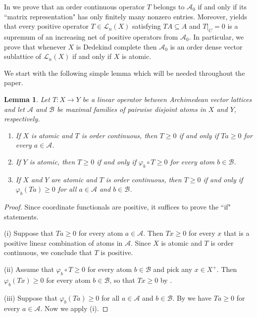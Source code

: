 \documentclass[12pt,reqno]{amsart}
\theoremstyle{plain}
\newtheorem{lemma}[theorem]{Lemma}
\theoremstyle{definition}
\begin{document}
In  we prove that an order continuous operator $T$ belongs to $\mathscr A_0$ if and only if its ``matrix representation" has only finitely many nonzero entries. Moreover,  yields that every positive operator $T\in \mathscr L_n(X)$ satisfying $TA\subseteq A$ and $T|_C=0$ is a supremum of an increasing net of positive operators from $\mathscr A_0$. In particular, we prove that whenever $X$ is Dedekind complete then $\mathscr A_0$ is an order dense vector sublattice of $\mathscr L_n(X)$ if and only if $X$ is atomic. 

We start with the following simple lemma which will be needed throughout the paper. 

\begin{lemma}\label{nicelni operator atomi}
Let $T\colon X\to Y$ be a linear operator between Archimedean vector lattices and let $\mathcal A$ and $\mathcal B$ be maximal families of pairwise disjoint atoms in $X$ and $Y$, respectively.
\begin{enumerate}
\item If $X$ is atomic and $T$ is order continuous, then $T\geq 0$ if and only if $Ta\geq 0$ for every $a\in \mathcal A$.  
\item If $Y$ is atomic, then $T\geq 0$ if and only if $\varphi_b\circ T\geq 0$ for every atom $b\in \mathcal B$.
\item If $X$ and $Y$ are atomic and $T$ is order continuous, then $T\geq 0$ if and only if $\varphi_b(Ta)\geq 0$ for all $a\in \mathcal A$
 and $b\in \mathcal B$.
\end{enumerate}
\end{lemma}

\begin{proof}
Since coordinate functionals are positive, it suffices to prove the ``if" statements. 

(i) Suppose that $Ta\geq 0$ for every atom $a\in \mathcal A$. Then $Tx\geq 0$ for every $x$ that is a positive linear combination of atoms in $\mathcal A$. Since $X$ is atomic and $T$ is order continuous, we conclude that $T$ is positive. 

(ii) Assume that $\varphi_b\circ T\geq 0$ for every atom $b\in \mathcal B$ and pick any $x\in X^+$. Then $\varphi_b(Tx)\geq 0$ for every atom $b\in \mathcal B$, so that $Tx\geq 0$  by .  

(iii) Suppose that $\varphi_b(Ta)\geq 0$ for all $a\in \mathcal A$ and $b\in \mathcal B$. By  we have $Ta\geq 0$ for every $a\in \mathcal A$. Now we apply (i). 
\end{proof}
\end{document}
